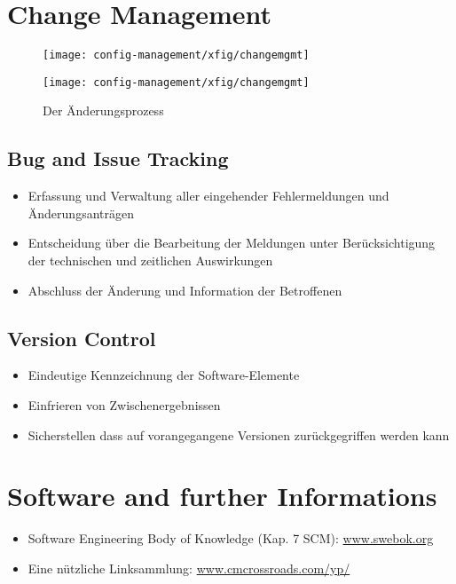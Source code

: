\section{Change Management}
\begin{figure}[H]
\ifslides
\begin{center}
\texttt{[image: config-management/xfig/changemgmt]}\\[2ex]
\end{center}\else
\texttt{[image: config-management/xfig/changemgmt]}
\caption{Der Änderungsprozess}
\fi
\end{figure}
\begin{minipage}[t]{0.48\linewidth}
\subsection*{Bug and Issue Tracking} %
\begin{itemize}
\item Erfassung und Verwaltung aller eingehender Fehlermeldungen
  und \"Anderungsanträgen
\item Entscheidung über die Bearbeitung der Meldungen unter Berücksichtigung
 der technischen und zeitlichen Auswirkungen
\item Abschluss der \"Anderung und Information der Betroffenen
\end{itemize}
\end{minipage}
\hfill
\begin{minipage}[t]{0.48\linewidth}
\subsection{Version Control}
\begin{itemize}
\item Eindeutige Kennzeichnung der Software-Elemente
\item Einfrieren von Zwischenergebnissen
\item Sicherstellen dass auf vorangegangene Versionen
  zurückgegriffen werden kann
\end{itemize}
\end{minipage}
\newslide
\section{Software and further Informations}
\begin{itemize}
\item Software Engineering Body of Knowledge (Kap. 7 SCM):
  \href{http://www.swebok.org}{www.swebok.org}
\item Eine nützliche  Linksammlung: \href{http://www.cmcrossroads.com/yp}
                                          {www.cmcrossroads.com/yp/}
\end{itemize}
\newslide
%
